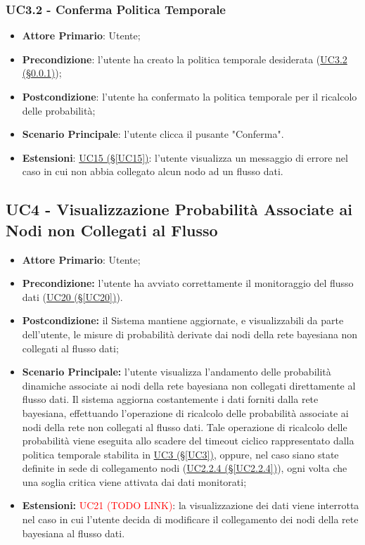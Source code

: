 \subsubsection{UC3.2 - Conferma Politica Temporale}\label{UC3.2}
\begin{itemize}
	\item \textbf{Attore Primario}: Utente; 
	\item \textbf{Precondizione}: l'utente ha creato la politica temporale desiderata (\hyperref[UC3.2]{UC3.2 (§\ref*{UC3.2})});
	\item \textbf{Postcondizione}: l'utente ha confermato la politica temporale per il ricalcolo delle probabilità; 
	\item \textbf{Scenario Principale}: l'utente clicca il pusante "Conferma".
	\item \textbf{Estensioni}: \hyperref[UC15]{UC15 (§\ref*{UC15})}: l'utente visualizza un messaggio di errore nel caso in cui non abbia collegato alcun nodo ad un flusso dati.
\end{itemize}

\newpage

\subsection{UC4 - Visualizzazione Probabilità Associate ai Nodi non Collegati al Flusso}\label{UC4}

\begin{itemize}
\item \textbf{Attore Primario}: Utente;
\item \textbf{Precondizione:} l'utente ha avviato correttamente il monitoraggio del flusso dati (\hyperref[UC20]{UC20 (§\ref*{UC20})}).
\item \textbf{Postcondizione:} il Sistema mantiene aggiornate, e visualizzabili da parte dell'utente, le misure di probabilità derivate dai nodi della rete bayesiana non collegati al flusso dati;
\item \textbf{Scenario Principale:} l'utente visualizza l'andamento delle probabilità dinamiche associate ai nodi 			della rete bayesiana non collegati direttamente al flusso dati. Il sistema aggiorna costantemente i dati forniti dalla rete bayesiana, effettuando l'operazione di ricalcolo delle probabilità associate ai nodi della rete non collegati al flusso dati. Tale operazione di ricalcolo delle probabilità viene eseguita allo scadere del timeout ciclico rappresentato dalla politica temporale stabilita in \hyperref[UC3]{UC3 (§\ref*{UC3})}, oppure, nel caso siano state definite in sede di collegamento nodi (\hyperref[UC2.2.4]{UC2.2.4 (§\ref*{UC2.2.4})}), ogni volta che una soglia critica viene attivata dai dati monitorati;
\item \textbf{Estensioni:} \textcolor{red}{UC21 (TODO LINK)}: la visualizzazione dei dati viene interrotta nel 			caso in cui l'utente decida di modificare il collegamento dei nodi della rete bayesiana al flusso dati.
\end{itemize}

